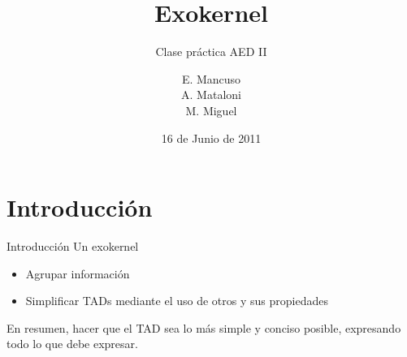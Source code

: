 \documentclass[10pt]{beamer}
\title{Exokernel}
\subtitle{Clase práctica AED II}
\author{E. Mancuso\\ A. Mataloni\\ M. Miguel }
\date{16 de Junio de 2011}
\begin{document}
 \begin{frame}
  \titlepage
 \end{frame}
 \begin{frame}
  \tableofcontents
 \end{frame}
\section{Introducción}
\begin{frame}{Introducción}
Un exokernel 

\begin{itemize}
 \item Agrupar información
 \item Simplificar TADs mediante el uso de otros y sus propiedades
\end{itemize}

En resumen, hacer que el TAD sea lo más simple y conciso posible, expresando todo lo que debe expresar. 
\end{frame}
\end{document}
